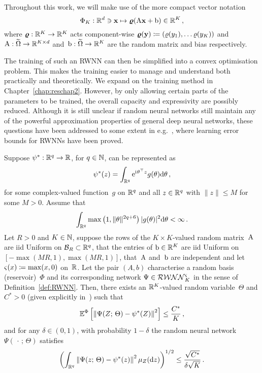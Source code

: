 \begin{remark}
Throughout this work, we will make use of the more compact vector notation
$$
\Phi_K: \mathbb{R}^d \ni \boldsymbol{\mathrm{x}}\mapsto \boldsymbol\varrho(\mathrm{A} \mathbf{x}+\mathrm{b}) \in \mathbb{R}^{K}\,,
$$
where $\boldsymbol\varrho:\mathbb{R}^K\rightarrow\mathbb{R}^K$ acts component-wise $\boldsymbol\varrho(\boldsymbol{\mathrm{y}})\coloneqq(\varrho(y_1), \dots \varrho(y_K))$ and~${\mathrm{A}: \widetilde{\Omega} \rightarrow \mathbb{R}^{K\times d}}$ and~${\mathrm{b}: \widetilde{\Omega} \rightarrow \mathbb{R}^K}$ are the random matrix and bias respectively.
\end{remark}

The training of such an RWNN can then be simplified into a convex optimisation problem. This makes the training easier to manage and understand both practically and theoretically. We expand on the training method in Chapter~\ref{chap:reschap2}. However, by only allowing certain parts of the parameters to be trained, the overall capacity and expressivity are possibly reduced. Although it is still unclear if random neural networks still maintain any of the powerful approximation properties of general deep neural networks, these questions have been addressed to some extent in e.g.~\cite{Gonon2020ApproximationSystems, Mei2022GeneralizationConcentration}, where learning error bounds for RWNNs have been proved.

\begin{proposition}\label{prop:UATRWNN}
Suppose $\psi^{*}: \mathbb{R}^{q} \rightarrow \mathbb{R}$, for $q\in\mathbb{N}$, can be represented as
$$
\psi^{*}(z)=\int_{\mathbb{R}^{q}} \mathrm{e}^{{\mathrm{i}\mkern1mu}\theta^\top z} g(\theta) \mathrm{d} \theta\,,
$$
for some complex-valued function~$g$ on $\mathbb{R}^{q}$ and all $z \in \mathbb{R}^{q}$ with $\|z\| \leq M$ for some $M>0$. Assume that
$$
\int_{\mathbb{R}^{q}} \max \left(1,\|\theta \|^{2 q+6}\right)|g(\theta)|^{2} \mathrm{d} \theta <\infty\,.
$$
Let $R>0$ and $K\in\mathbb{N}$, suppose the rows of the $K\times K$-valued random matrix~$\mathrm{A}$ are iid Uniform on $\mathcal{B}_{R} \subset \mathbb{R}^{q}$, that the entries of $\mathrm{b}\in\mathbb{R}^{K}$ are iid Uniform on~$[-\max (M R, 1), \max (M R, 1)]$, 
that~$\mathrm{A}$ and~$\mathrm{b}$ are independent and let~${\varsigma(x)\coloneqq\max (x, 0)}$ on~$\mathbb{R}$. 
Let the pair $(A,b)$ characterise a random basis (reservoir)~$\Phi$ and its corresponding network $\Psi\in\mathcal{RWNN}^{\varsigma}_K$ in the sense of Definition~\ref{def:RWNN}. 
Then, there exists an $\mathbb{R}^K$-valued random variable~$\Theta$ and $C^{*}>0$ 
(given explicitly in~\cite[Equation~(33)]{Gonon2020ApproximationSystems}) such that
$$
\mathbb{E}^\Phi\left[\left\|\Psi(Z;\, \Theta)-\psi^{*}(Z)\right\|^{2}\right] \leq \frac{C^{*}}{K}\,,
$$
and for any $\delta \in(0,1)$, with probability $1-\delta$ the random neural network $\Psi(\,\cdot\,;\,\Theta)$ satisfies
$$
\left(\int_{\mathbb{R}^{q}}\left\|\Psi(z;\, \Theta)-\psi^{*}(z)\right\|^{2} \mu_{Z}(\mathrm{d} z)\right)^{1 / 2} \leq \frac{\sqrt{C^{*}}}{\delta \sqrt{K}}\,.
$$
\end{proposition}

